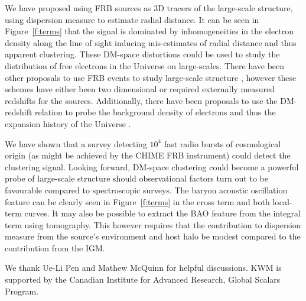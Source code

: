 \documentclass[twocolumn,prl,nofootinbib,floatfix]{revtex4-1}
\begin{document}
We have proposed using FRB sources as 3D tracers of the large-scale structure,
using dispersion measure to estimate radial distance. It can be seen in
Figure~\ref{f:terms} that the signal is dominated by inhomogeneities in the
electron density along the line of sight inducing mis-estimates of radial
distance and thus apparent clustering. These DM-space distortions could be used
to study the distribution of free electrons in the Universe on large-scales.
There have been other proposals to use FRB events to study large-scale
structure \citep{2014ApJ...780L..33M,2014MNRAS.443L..11D}, however these
schemes have either been two dimensional or required externally measured redshifts
for the sources. Additionally, there have been proposals to use the DM-redshift
relation to probe the background density of electrons and thus the expansion
history of the Universe
\citep{2014ApJ...783L..35D,2014PhRvD..89j7303Z,2014ApJ...788..189G}.

We have
shown that a survey detecting $10^4$ fast radio bursts of cosmological
origin (as might be achieved by the CHIME FRB instrument) could detect the
clustering signal.
Looking forward, DM-space
clustering could become a powerful probe of large-scale structure should
observational factors turn out to be favourable compared to spectroscopic
surveys. The baryon acoustic oscillation feature can be clearly seen in
Figure~\ref{f:terms} in the cross term and both
local-term curves. It may also be possible to extract the BAO feature
from the integral
term using tomography.
This however requires that the contribution to dispersion measure from
the source's environment and host halo be modest compared to the
contribution from the IGM.


\begin{acknowledgments}

We thank Ue-Li Pen and Mathew McQuinn for helpful discussions.
%
KWM is supported by the Canadian Institute for Advanced Research, Global Scalars
Program.

\end{acknowledgments}




\end{document}
